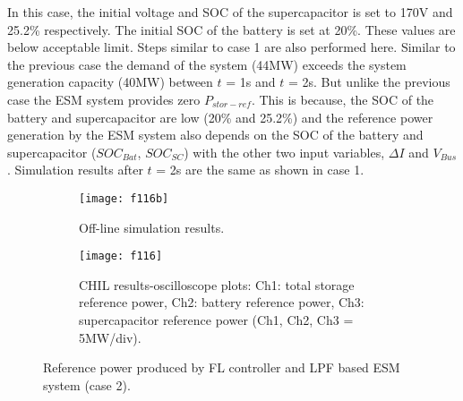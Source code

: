 In this case, the initial voltage and SOC of the supercapacitor is set to 170V and 25.2\% respectively. The initial SOC of the battery is set at 20\%. These values are below acceptable limit. Steps similar to case 1 are also performed here. Similar to the previous case the demand of the system (44MW) exceeds the system generation capacity (40MW) between $t$ = 1s and $t$ = 2s. But unlike the previous case the ESM system provides zero $P_{stor-ref}$. This is because, the SOC of the battery and supercapacitor are low (20\% and 25.2\%) and the reference power generation by the ESM system also depends on the SOC of the battery and supercapacitor ($SOC_{Bat}$, $SOC_{SC}$) with the other two input variables, $\Delta I$ and $V_{Bus}$. Simulation results after $t$ = 2s are the same as shown in case 1.
\begin{figure}[ht!]
\begin{subfigure}{1\columnwidth}
\begin{center}
\texttt{[image: f116b]}
\end{center}
\caption{Off-line simulation results.}
\label{ch5_f116b}
\end{subfigure}
\begin{subfigure}{1\columnwidth}
\begin{center}
\texttt{[image: f116]}
\end{center}
\caption{CHIL results-oscilloscope plots: Ch1: total storage reference power, Ch2: battery reference power, Ch3: supercapacitor reference  power (Ch1, Ch2, Ch3 = 5MW/div).}
\label{ch5_f116a}
\end{subfigure}
\caption{Reference power produced by FL controller and LPF based ESM system (case 2).}
\label{ch5_f116}
\end{figure}
